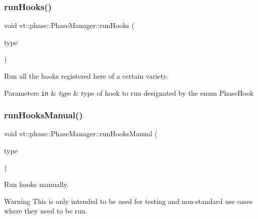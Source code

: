 \subsubsection{\texorpdfstring{run\+Hooks()}{runHooks()}}
{\footnotesize\ttfamily void vt\+::phase\+::\+Phase\+Manager\+::run\+Hooks (\begin{DoxyParamCaption}\item[{\hyperlink{namespacevt_1_1phase_aec9a63fdd99680d7a7fe99d321193811}{Phase\+Hook}}]{type }\end{DoxyParamCaption})\hspace{0.3cm}{\ttfamily [private]}}



Run all the hooks registered here of a certain variety. 


\begin{DoxyParams}[1]{Parameters}
\mbox{\tt in}  & {\em type} & type of hook to run designated by the enum {\ttfamily Phase\+Hook} \\
\hline
\end{DoxyParams}
\mbox{\label{structvt_1_1phase_1_1_phase_manager_ae436f95e5eb570b17c71a48d96675f69}} 
\subsubsection{\texorpdfstring{run\+Hooks\+Manual()}{runHooksManual()}}
{\footnotesize\ttfamily void vt\+::phase\+::\+Phase\+Manager\+::run\+Hooks\+Manual (\begin{DoxyParamCaption}\item[{\hyperlink{namespacevt_1_1phase_aec9a63fdd99680d7a7fe99d321193811}{Phase\+Hook}}]{type }\end{DoxyParamCaption})}



Run hooks manually. 

\begin{DoxyWarning}{Warning}
This is only intended to be used for testing and non-\/standard use cases where they need to be run. 
\end{DoxyWarning}
\mbox{\label{structvt_1_1phase_1_1_phase_manager_a9cc247a2194bc858fa043a5fe5c9fb76}} 
